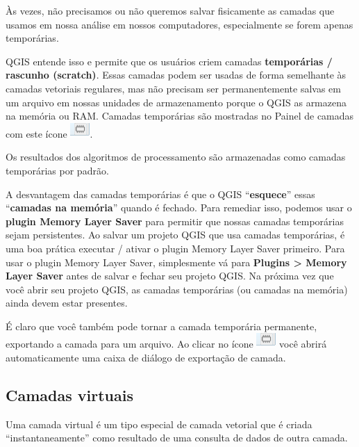 \documentclass[
  portuguese,
]{krantz}
\begin{document}
Às vezes, não precisamos ou não queremos salvar fisicamente as camadas que usamos em nossa análise em nossos computadores, especialmente se forem apenas temporárias.

QGIS entende isso e permite que os usuários criem camadas \textbf{temporárias / rascunho (scratch)}. Essas camadas podem ser usadas de forma semelhante às camadas vetoriais regulares, mas não precisam ser permanentemente salvas em um arquivo em nossas unidades de armazenamento porque o QGIS as armazena na memória ou RAM. Camadas temporárias são mostradas no Painel de camadas com este ícone \includegraphics{media/modulo2/symbol-temp.png}.

Os resultados dos algoritmos de processamento são armazenadas como camadas temporárias por padrão.

A desvantagem das camadas temporárias é que o QGIS ``\textbf{esquece}'' essas ``\textbf{camadas na memória}'' quando é fechado. Para remediar isso, podemos usar o \textbf{plugin Memory Layer Saver} para permitir que nossas camadas temporárias sejam persistentes. Ao salvar um projeto QGIS que usa camadas temporárias, é uma boa prática executar / ativar o plugin Memory Layer Saver primeiro. Para usar o plugin Memory Layer Saver, simplesmente vá para \textbf{Plugins \textgreater{} Memory Layer Saver} antes de salvar e fechar seu projeto QGIS. Na próxima vez que você abrir seu projeto QGIS, as camadas temporárias (ou camadas na memória) ainda devem estar presentes.

É claro que você também pode tornar a camada temporária permanente, exportando a camada para um arquivo. Ao clicar no ícone \includegraphics{media/modulo2/symbol-temp.png} você abrirá automaticamente uma caixa de diálogo de exportação de camada.

\hypertarget{camadas-virtuais}{%
\subsection{\texorpdfstring{\textbf{Camadas virtuais}}{Camadas virtuais}}\label{camadas-virtuais}}

Uma camada virtual é um tipo especial de camada vetorial que é criada ``instantaneamente'' como resultado de uma consulta de dados de outra camada.
\end{document}
